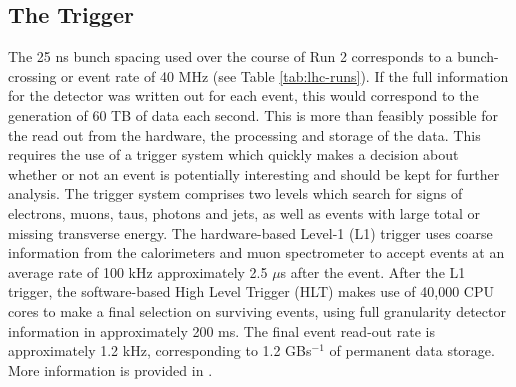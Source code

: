 




\subsection{The Trigger}
The 25 ns bunch spacing used over the course of Run 2 corresponds to a bunch-crossing or event rate of 40 MHz (see Table \ref{tab:lhc-runs}). If the full information for the detector was written out for each event, this would correspond to the generation of 60 TB of data each second. This is more than feasibly possible for the read out from the hardware, the processing and storage of the data. This requires the use of a trigger system which quickly makes a decision about whether or not an event is potentially interesting and should be kept for further analysis. The trigger system comprises two levels which search for signs of electrons, muons, taus, photons and jets, as well as events with large total or missing transverse energy. The hardware-based Level-1 (L1) trigger uses coarse information from the calorimeters and muon spectrometer to accept events at an average rate of 100 kHz approximately 2.5 $\mu$s after the event. After the L1 trigger, the software-based High Level Trigger (HLT) makes use of 40,000 CPU cores to make a final selection on surviving events, using full granularity detector information in approximately 200 ms. The final event read-out rate is approximately 1.2 kHz, corresponding to 1.2 GBs$^{-1}$ of permanent data storage. More information is provided in \cite{TRIG-2016-01}.

